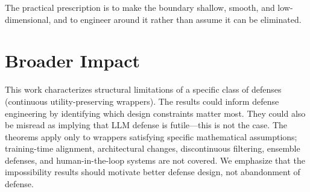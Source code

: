 \documentclass{article}
\begin{document}
The practical prescription is to make the boundary shallow, smooth,
and low-dimensional, and to engineer around it rather than assume it
can be eliminated.

\section*{Broader Impact}
This work characterizes structural limitations of a specific class
of defenses (continuous utility-preserving wrappers). The results
could inform defense engineering by identifying which design
constraints matter most. They could also be misread as implying
that LLM defense is futile---this is not the case. The theorems
apply only to wrappers satisfying specific mathematical assumptions;
training-time alignment, architectural changes, discontinuous
filtering, ensemble defenses, and human-in-the-loop systems are
not covered. We emphasize that the impossibility results should
motivate better defense design, not abandonment of defense.
\end{document}
